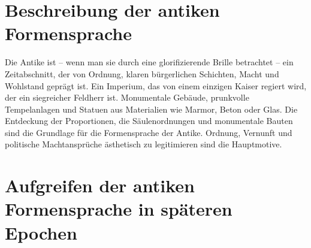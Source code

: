 \documentclass[
    a4paper,
    11pt,
    bibliography=totoc,
    listof=totoc,
    parskip=half,
    headings=normal
]{scrbook}
\begin{document}
\section{Beschreibung der antiken Formensprache}
Die Antike ist -- wenn man sie durch eine glorifizierende Brille betrachtet -- ein Zeitabschnitt, der von Ordnung, klaren bürgerlichen Schichten, Macht und Wohlstand geprägt ist. Ein Imperium, das von einem einzigen Kaiser regiert wird, der ein siegreicher Feldherr ist. Monumentale Gebäude, prunkvolle Tempelanlagen und Statuen aus Materialien wie Marmor, Beton oder Glas.
Die Entdeckung der Proportionen, die Säulenordnungen und monumentale Bauten sind die Grundlage für die Formensprache der Antike. Ordnung, Vernunft und politische Machtansprüche ästhetisch zu legitimieren sind die Hauptmotive.

\section{Aufgreifen der antiken Formensprache in späteren Epochen}
\end{document}
